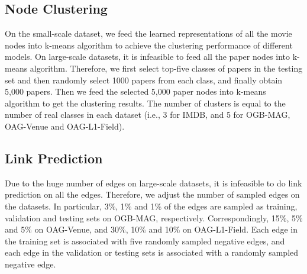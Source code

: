 \documentclass[10pt,journal,compsoc]{IEEEtran}
\begin{document}
\subsection*{Node Clustering} \label{section-appendix-node_clustering}
On the small-scale dataset, we feed the learned representations of all the movie nodes into k-means algorithm to achieve the clustering performance of different models. On large-scale datasets, it is infeasible to feed all the paper nodes into k-means algorithm. Therefore, we first select top-five classes of papers in the testing set and then randomly select 1000 papers from each class, and finally obtain 5,000 papers. Then we feed the selected 5,000 paper nodes into k-means algorithm to get the clustering results. The number of clusters is equal to the number of real classes in each dataset (i.e., 3 for IMDB, and 5 for OGB-MAG, OAG-Venue and OAG-L1-Field).

\subsection*{Link Prediction} \label{section-appendix-link_prediction}
Due to the huge number of edges on large-scale datasets, it is infeasible to do link prediction on all the edges. Therefore, we adjust the number of sampled edges on the datasets. In particular, 3\%, 1\% and 1\% of the edges are sampled as training, validation and testing sets on OGB-MAG, respectively. Correspondingly, 15\%, 5\% and 5\% on OAG-Venue, and 30\%, 10\% and 10\% on OAG-L1-Field. Each edge in the training set is associated with five randomly sampled negative edges, and each edge in the validation or testing sets is associated with a randomly sampled negative edge.








\end{document}
